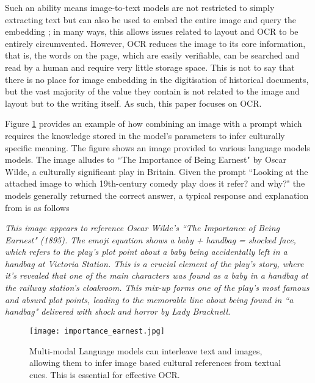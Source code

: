 \documentclass{article} %
\begin{document}
Such an ability means image-to-text models are not restricted to simply extracting text but can also be used to embed the entire image and query the embedding \cite{faysse_colpali_2024}; in many ways, this allows issues related to layout and OCR to be entirely circumvented. However, OCR reduces the image to its core information, that is, the words on the page, which are easily verifiable, can be searched and read by a human and require very little storage space. This is not to say that there is no place for image embedding in the digitisation of historical documents, but the vast majority of the value they contain is not related to the image and layout but to the writing itself. As such, this paper focuses on OCR.

Figure \ref{fig:importance_earnest} provides an example of how combining an image with a prompt which requires the knowledge stored in the model's parameters to infer culturally specific meaning. The figure shows an image provided to various language models \cite{anthropic_claude_2024, agarwal_many-shot_2024, team_gemini_2024, openai_gpt-4_2024} models. The image alludes to ``The Importance of Being Earnest" by Oscar Wilde, a culturally significant play in Britain. Given the prompt ``Looking at the attached image to which 19th-century comedy play does it refer? and why?" the models generally returned the correct answer, a typical response and explanation from \cite{anthropic_claude_2024} is as follows\newline

\textit{This image appears to reference Oscar Wilde's ``The Importance of Being Earnest" (1895). The emoji equation shows a baby + handbag = shocked face, which refers to the play's plot point about a baby being accidentally left in a handbag at Victoria Station. This is a crucial element of the play's story, where it's revealed that one of the main characters was found as a baby in a handbag at the railway station's cloakroom. This mix-up forms one of the play's most famous and absurd plot points, leading to the memorable line about being found in ``a handbag" delivered with shock and horror by Lady Bracknell.}
\newline

\begin{figure}
    \centering
    \texttt{[image: importance\_earnest.jpg]}
    \caption{Multi-modal Language models can interleave text and images, allowing them to infer image based cultural references from textual cues. This is essential for effective OCR. }
    \label{fig:importance_earnest}
\end{figure}
\end{document}
